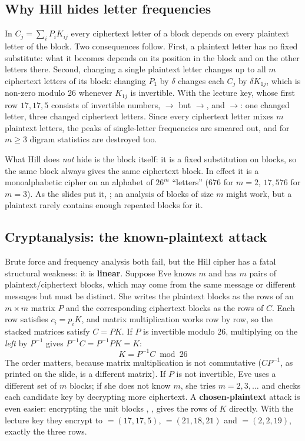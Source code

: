 \subsection{Why Hill hides letter frequencies}
In $C_j = \sum_i P_i K_{ij}$ every ciphertext letter of a block depends on every plaintext letter of the block. Two consequences follow. First, a plaintext letter has no fixed substitute: what it becomes depends on its position in the block and on the other letters there. Second, changing a single plaintext letter changes up to all $m$ ciphertext letters of its block: changing $P_1$ by $\delta$ changes each $C_j$ by $\delta K_{1j}$, which is non-zero modulo 26 whenever $K_{1j}$ is invertible. With the lecture key, whose first row $17, 17, 5$ consists of invertible numbers, $\to$ but $\to$, and $\to$: one changed letter, three changed ciphertext letters. Since every ciphertext letter mixes $m$ plaintext letters, the peaks of single-letter frequencies are smeared out, and for $m \ge 3$ digram statistics are destroyed too.

What Hill does \emph{not} hide is the block itself: it is a fixed substitution on blocks, so the same block always gives the same ciphertext block. In effect it is a monoalphabetic cipher on an alphabet of $26^m$ ``letters'' ($676$ for $m = 2$, $17{,}576$ for $m = 3$). As the slides put it, ; an analysis of blocks of size $m$ might work, but a plaintext rarely contains enough repeated blocks for it.

\subsection{Cryptanalysis: the known-plaintext attack}
Brute force and frequency analysis both fail, but the Hill cipher has a fatal structural weakness: it is \textbf{linear}. Suppose Eve knows $m$ and has $m$ pairs of plaintext/ciphertext blocks, which may come from the same message or different messages but must be distinct. She writes the plaintext blocks as the rows of an $m \times m$ matrix $P$ and the corresponding ciphertext blocks as the rows of $C$. Each row satisfies $c_i = p_i K$, and matrix multiplication works row by row, so the stacked matrices satisfy $C = PK$. If $P$ is invertible modulo 26, multiplying on the \emph{left} by $P^{-1}$ gives $P^{-1}C = P^{-1}PK = K$:
\[
\boxed{K = P^{-1}C \bmod 26}
\]
The order matters, because matrix multiplication is not commutative ($CP^{-1}$, as printed on the slide, is a different matrix). If $P$ is not invertible, Eve uses a different set of $m$ blocks; if she does not know $m$, she tries $m = 2, 3, \dots$ and checks each candidate key by decrypting more ciphertext. A \textbf{chosen-plaintext} attack is even easier: encrypting the unit blocks , ,  gives the rows of $K$ directly. With the lecture key they encrypt to  $= (17, 17, 5)$,  $= (21, 18, 21)$ and  $= (2, 2, 19)$, exactly the three rows.

